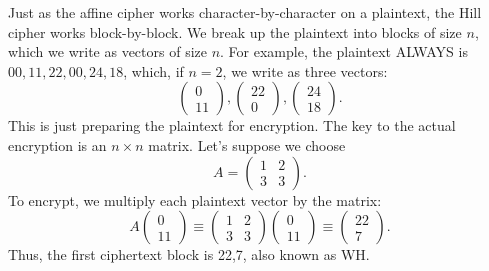 \documentclass{article}
\theoremstyle{plain}
\theoremstyle{definition}
\theoremstyle{remark}
\numberwithin{theorem}{section}
\begin{document}
Just as the affine cipher works character-by-character on a plaintext, the Hill cipher works block-by-block.  We break up the plaintext into blocks of size $n$, which we write as vectors of size $n$.  For example, the plaintext ALWAYS is $00, 11, 22, 00, 24, 18$, which, if $n=2$, we write as three vectors:
\[
	\begin{pmatrix} 0 \\ 11  \end{pmatrix},
	\begin{pmatrix} 22 \\ 0  \end{pmatrix},
	\begin{pmatrix} 24 \\ 18  \end{pmatrix}.
\]
This is just preparing the plaintext for encryption.
The key to the actual encryption is an $n \times n$ matrix.  Let's suppose we choose 
\[
A = \begin{pmatrix} 1 & 2 \\ 3 & 3 \end{pmatrix}.
\]
To encrypt, we multiply each plaintext vector by the matrix:
\[
	A \begin{pmatrix} 0 \\ 11  \end{pmatrix}
 \equiv \begin{pmatrix} 1 & 2 \\ 3 & 3 \end{pmatrix}
 \begin{pmatrix} 0 \\ 11  \end{pmatrix}
 \equiv \begin{pmatrix} 
 22 \\ 7
 \end{pmatrix}.
\]
Thus, the first ciphertext block is 22,7, also known as WH.
\end{document}
